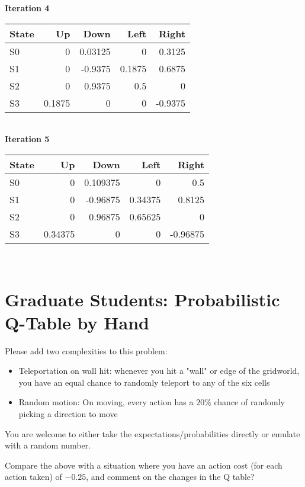 \documentclass{exam}
\begin{document}
\textbf{Iteration 4}\\

\begin{tabular}{lrrrr}
\hline
State & Up & Down & Left & Right \\
\hline
S0 & 0 & 0.03125 & 0 & 0.3125 \\
S1 & 0 & -0.9375 & 0.1875 & 0.6875 \\
S2 & 0 & 0.9375 & 0.5 & 0 \\
S3 & 0.1875 & 0 & 0 & -0.9375 \\
\hline
\end{tabular}\\

\textbf{Iteration 5}\\

\begin{tabular}{lrrrr}
\hline
State & Up & Down & Left & Right \\
\hline
S0 & 0 & 0.109375 & 0 & 0.5 \\
S1 & 0 & -0.96875 & 0.34375 & 0.8125 \\
S2 & 0 & 0.96875 & 0.65625 & 0 \\
S3 & 0.34375 & 0 & 0 & -0.96875 \\
\hline
\end{tabular}\\


\section{Graduate Students: Probabilistic Q-Table by Hand}

Please add two complexities to this problem:

\begin{itemize}
    \item Teleportation on wall hit: whenever you hit a "wall" or edge of the gridworld, you have an equal chance to randomly teleport to any of the six cells
    \item Random motion: On moving, every action has a $20\%$ chance of randomly picking a direction to move
\end{itemize}

You are welcome to either take the expectations/probabilities directly or emulate with a random number.

Compare the above with a situation where you have an action cost (for each action taken) of $-0.25$, and comment on the changes in the Q table?\\
\end{document}
